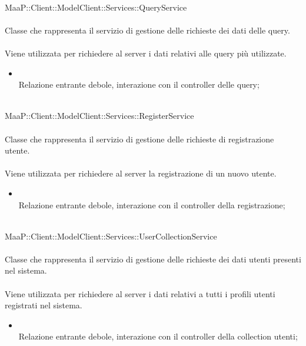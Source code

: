 \\
MaaP::Client::ModelClient::Services::QueryService\\
\\
Classe che rappresenta il servizio di gestione delle richieste dei dati delle query.\\
\\
Viene utilizzata per richiedere al server i dati relativi alle query più utilizzate.\\
\begin{itemize}
\item{}\\
Relazione entrante debole, interazione con il controller delle query;
\end{itemize}

\\
MaaP::Client::ModelClient::Services::RegisterService\\
\\
Classe che rappresenta il servizio di gestione delle richieste di registrazione utente.\\
\\
Viene utilizzata per richiedere al server la registrazione di un nuovo utente.\\
\begin{itemize}
\item{}\\
Relazione entrante debole, interazione con il controller della registrazione;
\end{itemize}

\\
MaaP::Client::ModelClient::Services::UserCollectionService\\
\\
Classe che rappresenta il servizio di gestione delle richieste dei dati utenti presenti nel sistema.\\
\\
Viene utilizzata per richiedere al server i dati relativi a tutti i profili utenti registrati nel sistema.\\
\begin{itemize}
\item{}\\
Relazione entrante debole, interazione con il controller della collection utenti;
\end{itemize}

